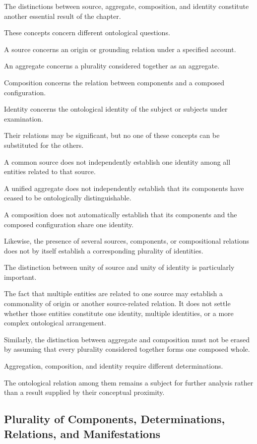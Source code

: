 The distinctions between source,
aggregate, composition, and identity
constitute another essential result
of the chapter.

These concepts concern different
ontological questions.

A source concerns an origin or
grounding relation under a specified
account.

An aggregate concerns a plurality
considered together as an aggregate.

Composition concerns the relation
between components and a composed
configuration.

Identity concerns the ontological
identity of the subject or subjects
under examination.

Their relations may be significant,
but no one of these concepts can
be substituted for the others.

A common source does not independently
establish one identity among all
entities related to that source.

A unified aggregate does not
independently establish that its
components have ceased to be
ontologically distinguishable.

A composition does not automatically
establish that its components
and the composed configuration
share one identity.

Likewise, the presence of several
sources, components, or compositional
relations does not by itself establish
a corresponding plurality of identities.

The distinction between unity of
source and unity of identity is
particularly important.

The fact that multiple entities
are related to one source may
establish a commonality of origin
or another source-related relation.
It does not settle whether those
entities constitute one identity,
multiple identities, or a more
complex ontological arrangement.

Similarly, the distinction between
aggregate and composition must
not be erased by assuming that
every plurality considered together
forms one composed whole.

Aggregation, composition, and
identity require different
determinations.

The ontological relation among
them remains a subject for
further analysis rather than
a result supplied by their
conceptual proximity.

\subsection{Plurality of Components, Determinations, Relations, and Manifestations}


